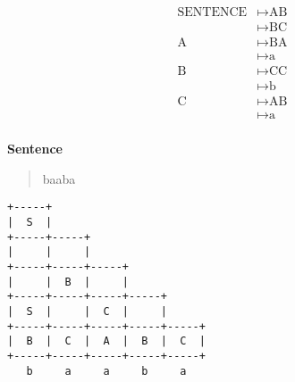 \begin{align*}
	\textrm{SENTENCE}&\mapsto \textrm{AB} 	\\
	&\mapsto \textrm{BC}			\\
	\textrm{A}&\mapsto\textrm{BA}		\\
	&\mapsto \textrm{a}			\\
	\textrm{B}&\mapsto\textrm{CC}		\\
	&\mapsto \textrm{b}			\\
	\textrm{C}&\mapsto\textrm{AB}		\\
	&\mapsto \textrm{a}			\\
\end{align*}

\textbf{Sentence}
\begin{quote}
	baaba
\end{quote}
\begin{verbatim}
+-----+
|  S  |
+-----+-----+
|     |     |
+-----+-----+-----+
|     |  B  |     |
+-----+-----+-----+-----+
|  S  |     |  C  |     |
+-----+-----+-----+-----+-----+
|  B  |  C  |  A  |  B  |  C  |
+-----+-----+-----+-----+-----+
   b     a     a     b     a
\end{verbatim}
\pagebreak
